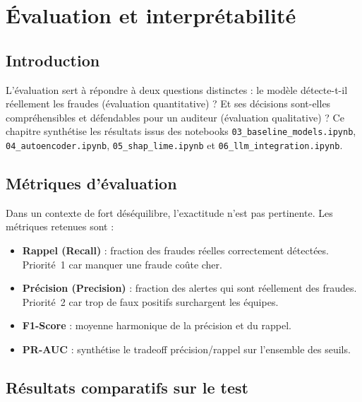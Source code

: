 \documentclass[12pt,a4paper,twoside]{report}
\begin{document}
\chapter{Évaluation et interprétabilité}

\section{Introduction}

L'évaluation sert à répondre à deux questions distinctes : le modèle détecte-t-il réellement les fraudes (évaluation quantitative) ? Et ses décisions sont-elles compréhensibles et défendables pour un auditeur (évaluation qualitative) ? Ce chapitre synthétise les résultats issus des notebooks \texttt{03\_baseline\_models.ipynb}, \texttt{04\_autoencoder.ipynb}, \texttt{05\_shap\_lime.ipynb} et \texttt{06\_llm\_integration.ipynb}.

\section{Métriques d'évaluation}

Dans un contexte de fort déséquilibre, l'exactitude n'est pas pertinente. Les métriques retenues sont :

\begin{itemize}
  \item \textbf{Rappel (Recall)} : fraction des fraudes réelles correctement détectées. Priorité~1 car manquer une fraude coûte cher.
  \item \textbf{Précision (Precision)} : fraction des alertes qui sont réellement des fraudes. Priorité~2 car trop de faux positifs surchargent les équipes.
  \item \textbf{F1-Score} : moyenne harmonique de la précision et du rappel.
  \item \textbf{PR-AUC} : synthétise le tradeoff précision/rappel sur l'ensemble des seuils.
\end{itemize}

\section{Résultats comparatifs sur le test}
\end{document}
